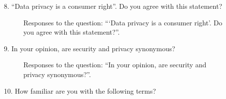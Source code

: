 8. ``Data privacy is a consumer right''. Do you agree with this statement?

\begin{figure}[H]
    \begin{center}
        \caption{Responses to the question: ```Data privacy is a consumer right'. Do you agree with this statement?''.}
        \label{fig:survey_s1_q8}
    \end{center}
\end{figure}

9. In your opinion, are security and privacy synonymous?

\begin{figure}[H]
    \centering
    \caption{Responses to the question: ``In your opinion, are security and privacy synonymous?''.}
    \label{fig:survey_s1_q9}
\end{figure}

10. How familiar are you with the following terms?


